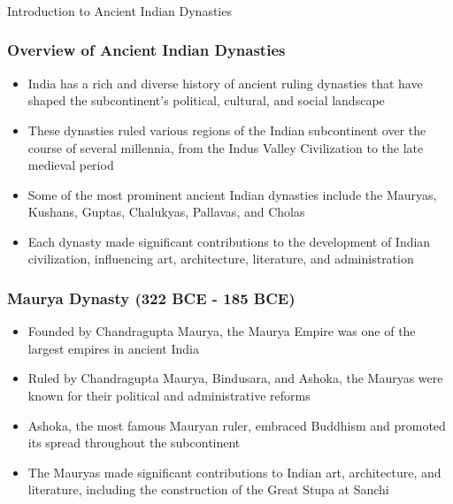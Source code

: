 \begin{frame}[fragile]\frametitle{}
\begin{center}
{\Large Introduction to Ancient Indian Dynasties}
\end{center}
\end{frame}

\begin{frame}[fragile]\frametitle{Overview of Ancient Indian Dynasties}
    \begin{itemize}
        \item India has a rich and diverse history of ancient ruling dynasties that have shaped the subcontinent's political, cultural, and social landscape
        \item These dynasties ruled various regions of the Indian subcontinent over the course of several millennia, from the Indus Valley Civilization to the late medieval period
        \item Some of the most prominent ancient Indian dynasties include the Mauryas, Kushans, Guptas, Chalukyas, Pallavas, and Cholas
        \item Each dynasty made significant contributions to the development of Indian civilization, influencing art, architecture, literature, and administration
    \end{itemize}
\end{frame}

\begin{frame}[fragile]\frametitle{Maurya Dynasty (322 BCE - 185 BCE)}
    \begin{itemize}
        \item Founded by Chandragupta Maurya, the Maurya Empire was one of the largest empires in ancient India
        \item Ruled by Chandragupta Maurya, Bindusara, and Ashoka, the Mauryas were known for their political and administrative reforms
        \item Ashoka, the most famous Mauryan ruler, embraced Buddhism and promoted its spread throughout the subcontinent
        \item The Mauryas made significant contributions to Indian art, architecture, and literature, including the construction of the Great Stupa at Sanchi
    \end{itemize}
\end{frame}

